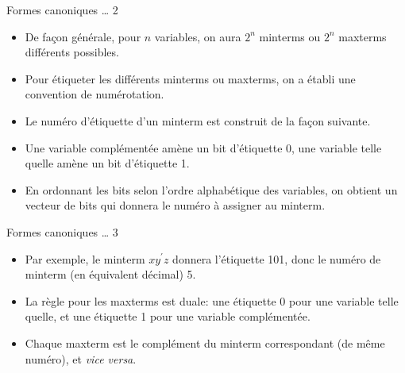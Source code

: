 \documentclass[presentation]{beamer}
\begin{document}
\begin{frame}[label={sec:org15ed4b6}]{Formes canoniques \ldots{} 2}
\begin{itemize}
\item De façon générale, pour \(n\) variables, on aura \(2^n\) minterms ou \(2^n\) maxterms différents possibles.

\item Pour étiqueter les différents minterms ou maxterms, on a établi une convention de numérotation.

\item Le numéro d'étiquette d'un minterm est construit de la façon suivante.

\item Une variable complémentée amène un bit d'étiquette 0, une variable telle quelle amène un bit d'étiquette 1.

\item En ordonnant les bits selon l'ordre alphabétique des variables, on obtient un vecteur de bits qui donnera le numéro à assigner au minterm.
\end{itemize}
\end{frame}

\begin{frame}[label={sec:org6a3f5fd}]{Formes canoniques \ldots{} 3}
\begin{itemize}
\item Par exemple, le minterm \(x y^\prime z\) donnera l'étiquette 101, donc le numéro de minterm (en équivalent décimal) 5.

\item La règle pour les maxterms est duale: une étiquette 0 pour une variable telle quelle, et une étiquette 1 pour une variable complémentée.

\item Chaque maxterm est le complément du minterm correspondant (de même numéro), et \emph{vice versa}.
\end{itemize}
\end{frame}
\end{document}
